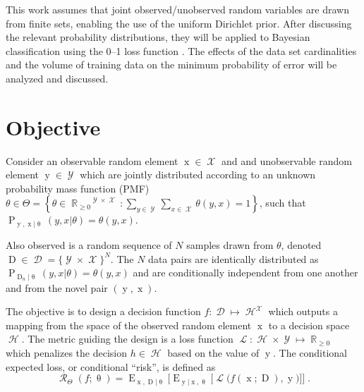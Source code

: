 \documentclass[conference]{IEEEtran}
\DeclareMathOperator{\xrm}{\mathrm{x}}
\DeclareMathOperator{\yrm}{\mathrm{y}}
\DeclareMathOperator{\Drm}{\mathrm{D}}
\DeclareMathOperator{\Prm}{\mathrm{P}}
\DeclareMathOperator{\Erm}{\mathrm{E}}
\DeclareMathOperator{\Xcal}{\mathcal{X}}
\DeclareMathOperator{\Ycal}{\mathcal{Y}}
\DeclareMathOperator{\Dcal}{\mathcal{D}}
\DeclareMathOperator{\Hcal}{\mathcal{H}}
\DeclareMathOperator{\Rcal}{\mathcal{R}}
\DeclareMathOperator{\Lcal}{\mathcal{L}}
\DeclareMathOperator{\Rbb}{\mathbb{R}}
\begin{document}
This work assumes that joint observed/unobserved random variables are drawn from finite sets, enabling the use of the uniform Dirichlet prior. After discussing the relevant probability distributions, they will be applied to Bayesian classification using the 0--1 loss function \cite{berger}. The effects of the data set cardinalities and the volume of training data on the minimum probability of error will be analyzed and discussed.







\section{Objective}

Consider an observable random element $\xrm \in \Xcal$ and and unobservable random element $\yrm \in \Ycal$ which are jointly distributed according to an unknown probability mass function (PMF) $\theta \in \Theta = \left\{ \theta \in {\Rbb_{\geq 0}}^{\Ycal \times \Xcal}: \sum_{y \in \Ycal} \sum_{x \in \Xcal} \theta(y,x) = 1 \right\}$, such that $\Prm_{\yrm,\xrm | \uptheta}(y,x | \theta) = \theta(y,x)$. 

Also observed is a random sequence of $N$ samples drawn from $\theta$, denoted $\Drm \in \Dcal = \{\Ycal \times \Xcal\}^N$. The $N$ data pairs are identically distributed as $\Prm_{\Drm_n | \uptheta}(y,x | \theta) = \theta(y,x)$ and are conditionally independent from one another and from the novel pair $(\yrm,\xrm)$.

The objective is to design a decision function $f: \Dcal \mapsto \Hcal^{\Xcal}$ which outputs a mapping from the space of the observed random element $\xrm$ to a decision space $\Hcal$. The metric guiding the design is a loss function $\Lcal: \Hcal \times \Ycal \mapsto \Rbb_{\geq 0}$ which penalizes the decision $h \in \Hcal$ based on the value of $\yrm$. The conditional expected loss, or conditional ``risk'', is defined as
\begin{equation} \label{eq:risk_cond}
\Rcal_{\Theta}(f ; \uptheta) = \Erm_{\xrm,\Drm | \uptheta} \bigg[ \Erm_{\yrm | \xrm,\uptheta} \Big[ \Lcal\big( f(\xrm;\Drm),\yrm \big) \Big] \bigg] \;.
\end{equation}
\end{document}
